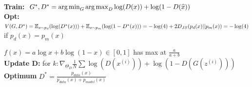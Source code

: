 \textbf{Train:} $G^*, D^* = \operatorname*{arg\,min}_G \operatorname*{arg\,max}_D \log(D(x)) + \log(1-D(\widehat{x}))$\\
\textbf{Opt:} $V(G, D^*) = \mathbb{E}_{x \sim p_d}(\log(D^*(x))) + \mathbb{E}_{x \sim p_m}(\log(1-D^*(x))) \\
= -\log(4) + 2 D_{JS}(p_d(x) || p_m(x))
= -\log(4)$ if $p_d(x) = p_m(x)$\\

$f(x) = a \log x + b \log (1-x) \in [0,1]$ has max at $\frac{a}{a+b}$\\

\textbf{Update D:} for $k: \nabla_{\Theta_D} \frac{1}{N} \sum \log(D(x^{(i)})) + \log (1 - D(G(z^{(i)})))$\\
\textbf{Optimum} $D^* = \frac{p_{data}(x)}{p_{data}(x) + p_{model}(x)}$\\

